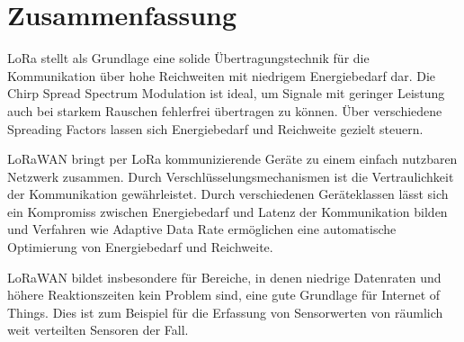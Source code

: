 \chapter{Zusammenfassung}


LoRa stellt als Grundlage eine solide Übertragungstechnik für die Kommunikation über hohe Reichweiten mit niedrigem Energiebedarf dar.
Die Chirp Spread Spectrum Modulation ist ideal, um Signale mit geringer Leistung auch bei starkem Rauschen fehlerfrei übertragen zu können.
Über verschiedene Spreading Factors lassen sich Energiebedarf und Reichweite gezielt steuern.

LoRaWAN bringt per LoRa kommunizierende Geräte zu einem einfach nutzbaren Netzwerk zusammen.
Durch Verschlüsselungsmechanismen ist die Vertraulichkeit der Kommunikation gewährleistet.
Durch verschiedenen Geräteklassen lässt sich ein Kompromiss zwischen Energiebedarf und Latenz der Kommunikation bilden und Verfahren wie Adaptive Data Rate ermöglichen eine automatische Optimierung von Energiebedarf und Reichweite.

LoRaWAN bildet insbesondere für Bereiche, in denen niedrige Datenraten und höhere Reaktionszeiten kein Problem sind, eine gute Grundlage für Internet of Things.
Dies ist zum Beispiel für die Erfassung von Sensorwerten von räumlich weit verteilten Sensoren der Fall.